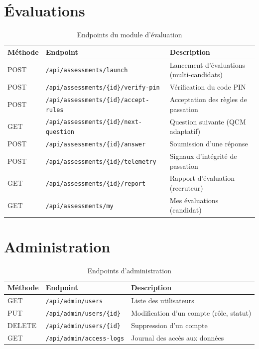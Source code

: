 \documentclass[12pt,a4paper]{report}
\begin{document}
\section{Évaluations}

\begin{table}[H]
\centering
\small
\caption{Endpoints du module d'évaluation}
\begin{tabularx}{\textwidth}{llX}
\toprule
\textbf{Méthode} & \textbf{Endpoint} & \textbf{Description} \\
\midrule
POST & \texttt{/api/assessments/launch} & Lancement d'évaluations (multi-candidats) \\
POST & \texttt{/api/assessments/\{id\}/verify-pin} & Vérification du code PIN \\
POST & \texttt{/api/assessments/\{id\}/accept-rules} & Acceptation des règles de passation \\
GET & \texttt{/api/assessments/\{id\}/next-question} & Question suivante (QCM adaptatif) \\
POST & \texttt{/api/assessments/\{id\}/answer} & Soumission d'une réponse \\
POST & \texttt{/api/assessments/\{id\}/telemetry} & Signaux d'intégrité de passation \\
GET & \texttt{/api/assessments/\{id\}/report} & Rapport d'évaluation (recruteur) \\
GET & \texttt{/api/assessments/my} & Mes évaluations (candidat) \\
\bottomrule
\end{tabularx}
\end{table}

\section{Administration}

\begin{table}[H]
\centering
\small
\caption{Endpoints d'administration}
\begin{tabularx}{\textwidth}{llX}
\toprule
\textbf{Méthode} & \textbf{Endpoint} & \textbf{Description} \\
\midrule
GET & \texttt{/api/admin/users} & Liste des utilisateurs \\
PUT & \texttt{/api/admin/users/\{id\}} & Modification d'un compte (rôle, statut) \\
DELETE & \texttt{/api/admin/users/\{id\}} & Suppression d'un compte \\
GET & \texttt{/api/admin/access-logs} & Journal des accès aux données \\
\bottomrule
\end{tabularx}
\end{table}
\end{document}
